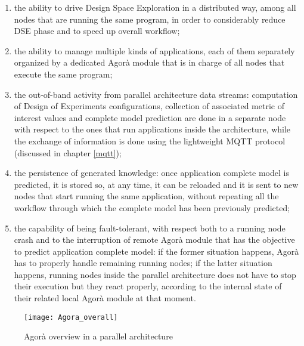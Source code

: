 \begin{enumerate}
    
    \item the ability to drive Design Space Exploration in a distributed way, among all nodes that are running the same program, in order to considerably reduce DSE phase and to speed up overall workflow;
    
    \item the ability to manage multiple kinds of applications, each of them separately organized by a dedicated Agorà module that is in charge of all nodes that execute the same program;
    
    \item the out-of-band activity from parallel architecture data streams: computation of Design of Experiments configurations, collection of associated metric of interest values and complete model prediction are done in a separate node with respect to the ones that run applications inside the architecture, while the exchange of information is done using the lightweight MQTT protocol (discussed in chapter \ref{mqtt});
    
    \item the persistence of generated knowledge: once application complete model is predicted, it is stored so, at any time, it can be reloaded and it is sent to new nodes that start running the same application, without repeating all the workflow through which the complete model has been previously predicted;
    
    \item the capability of being fault-tolerant, with respect both to a running node crash and to the interruption of remote Agorà module that has the objective to predict application complete model: if the former situation happens, Agorà has to properly handle remaining running nodes; if the latter situation happens, running nodes inside the parallel architecture does not have to stop their execution but they react properly, according to the internal state of their related local Agorà module at that moment.

\end{enumerate}

\begin{figure}[H]

    \centering
    \texttt{[image: Agora\_overall]}
    \caption{Agorà overview in a parallel architecture}
    \label{fig::tesiCris_overview}
    
\end{figure}

